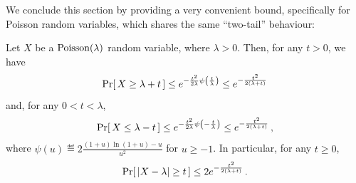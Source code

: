 We conclude this section by providing a very convenient bound, specifically for Poisson random variables, which shares the same ``two-tail'' behaviour:
\begin{theorem}\label{theo:main:poisson:bounds}
Let $X$ be a $\poisson{\lambda}$ random variable, where $\lambda > 0$. Then, for any $t>0$, we have
\begin{equation}\label{eq:poisson:upper:tail}
    \probaOf{ X \geq \lambda + t} \leq e^{-\frac{t^2}{2\lambda}\psi\Paren{\frac{t}{\lambda}}} \leq e^{-\frac{t^2}{2(\lambda+t)}}
\end{equation}
and, for any $0<t< \lambda$,
\begin{equation}\label{eq:poisson:lower:tail}
  \probaOf{ X \leq \lambda - t} \leq e^{-\frac{t^2}{2\lambda}\psi\Paren{-\frac{t}{\lambda}}} \leq e^{-\frac{t^2}{2(\lambda+t)}}\,,
\end{equation}
where $\psi(u)\eqdef 2\frac{(1+u)\ln(1+u)-u}{u^2}$ for $u\geq -1$.
In particular, for any $t\geq 0$,
\begin{equation}\label{eq:poisson:both:tail}
  \probaOf{ \abs{X -\lambda} \geq t} \leq 2e^{-\frac{t^2}{2(\lambda+t)}}\,.
\end{equation}
\end{theorem}
\fi
